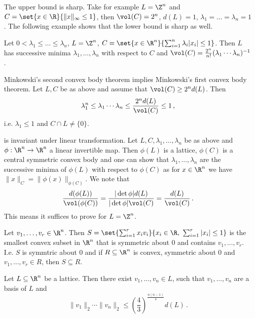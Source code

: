\begin{rem*}
	The upper bound is sharp.
	Take for example \( L = \Z^n \) and \( C = \set{x \in \R}{\|x\|_\infty \leq 1} \), then \( \vol(C) = 2^n \), \( d(L) = 1 \), \( \lambda_1 = \dots = \lambda_n = 1 \).
	The following example shows that the lower bound is sharp as well.
\end{rem*}

\begin{exmp*}
	Let \( 0 < \lambda_1 \leq \dots \leq \lambda_n \), \( L = \Z^n \), \( C = \set{x \in \R^n}{\sum_{i=1}^{n} \lambda_i |x_i| \leq 1} \).
	Then \( L \) has successive minima \( \lambda_1, \dotsc, \lambda_n \) with respect to \( C \) and \( \vol(C) = \frac{2^n}{n!} (\lambda_1 \dotsm \lambda_n)^{-1} \).
\end{exmp*}

Minkowski's second convex body theorem implies Minkowski's first convex body theorem.
Let \( L, C \) be as above and assume that \( \vol(C) \geq 2^n d(L) \).
Then
\[ \lambda_1^n \leq \lambda_1 \dotsm \lambda_n \leq \frac{2^n d(L)}{\vol(C)} \leq 1\,, \]
i.e. \( \lambda_1 \leq 1 \) and \( C \cap L \neq \{0\} \).

\begin{rem*}
	 is invariant under linear transformation.
	Let \( L, C, \lambda_1, \dotsc, \lambda_n \) be as above and \( \phi: \R^n \to \R^n \) a linear invertible map.
	Then \( \phi(L) \) is a lattice, \( \phi(C) \) is a central symmetric convex body and one can show that \( \lambda_1, \dotsc, \lambda_n \) are the successive minima of \( \phi(L) \) with respect to \( \phi(C) \) as for \( x \in \R^n \) we have \( \|x\|_C = \|\phi(x)\|_{\phi(C)} \).
	We note that
	\[ \frac{d(\phi(L))}{\vol(\phi(C))} = \frac{|\det \phi| d(L)}{|\det \phi| \vol(C)} = \frac{d(L)}{\vol(C)} \, . \]
	This means it suffices to prove  for \( L = \Z^n \).
\end{rem*}

\begin{lem}
	Let \( v_1, \dotsc, v_r \in \R^n \).
	Then \( S = \set{\sum_{i=1}^{r} x_i v_i}{x_i \in \R,\ \sum_{i=1}^{r} |x_i| \leq 1 } \) is the smallest convex subset in \( \R^n \) that is symmetric about \( 0 \) and contains \( v_1, \dotsc, v_r \).
	I.e. \( S \) is symmtric about 0 and if \( R \subseteq \R^n \) is convex, symmetric about 0 and \( v_1, \dotsc, v_r \in R \), then \( S \subseteq R \).
\end{lem}

\begin{thmn}\label{thm:3.13}
	Let \( L \subseteq \R^n \) be a lattice.
	Then there exist \( v_1, \dotsc, v_n \in L \), such that \( v_1, \dotsc, v_n \) are a basis of \( L \) and
	\[ \|v_1\|_2 \dotsm \|v_n\|_2 \leq \left(\frac{4}{3}\right)^{\frac{n(n-1)}{4}} d(L) \,. \]
\end{thmn}

